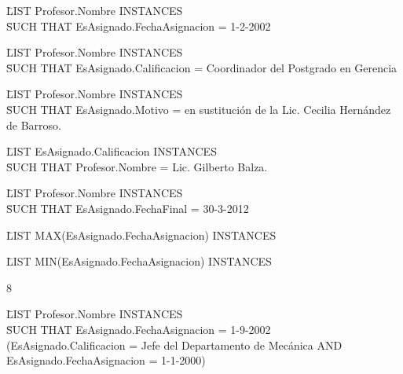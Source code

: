 \begin{tabbing}	
\= LIST Profesor.Nombre INSTANCES \\
\= SUCH THAT EsAsignado.FechaAsignacion = 1-2-2002 \\
\end{tabbing}

\begin{tabbing}	
\= LIST Profesor.Nombre INSTANCES \\
\= SUCH THAT EsAsignado.Calificacion = Coordinador del Postgrado en Gerencia \\
\end{tabbing}

\begin{tabbing}	
\= LIST Profesor.Nombre INSTANCES \\
\= SUCH THAT EsAsignado.Motivo = en sustitución de la Lic. Cecilia Hernández de Barroso. \\
\end{tabbing}

\begin{tabbing}	
\= LIST EsAsignado.Calificacion INSTANCES \\
\= SUCH THAT Profesor.Nombre = Lic. Gilberto Balza. \\
\end{tabbing}

\begin{tabbing}	
\= LIST Profesor.Nombre INSTANCES \\
\= SUCH THAT EsAsignado.FechaFinal = 30-3-2012 \\
\end{tabbing}

\begin{tabbing}	
\= LIST MAX(EsAsignado.FechaAsignacion) INSTANCES \\
\end{tabbing}

\begin{tabbing}	
\= LIST MIN(EsAsignado.FechaAsignacion) INSTANCES \\
\end{tabbing}

8

\begin{tabbing}	
\= LIST Profesor.Nombre INSTANCES \\
\= SUCH THAT EsAsignado.FechaAsignacion = 1-9-2002 \\
(EsAsignado.Calificacion = Jefe del Departamento de Mecánica AND EsAsignado.FechaAsignacion = 1-1-2000)
\end{tabbing}

